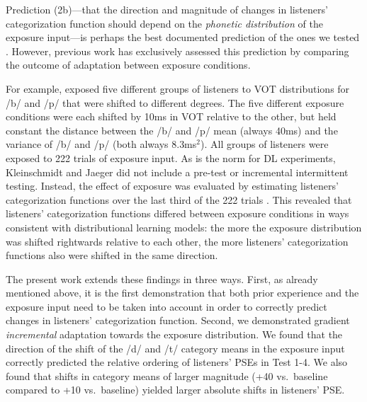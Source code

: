 \documentclass[
  11pt,
  man,mask,floatsintext]{apa6}
\begin{document}
Prediction (2b)---that the direction and magnitude of changes in listeners' categorization function should depend on the \emph{phonetic distribution} of the exposure input---is perhaps the best documented prediction of the ones we tested \autocite{bejjanki2011,chladkova2017,clayards2008,colby2018,kleinschmidt-jaeger2011,kleinschmidt-jaeger2012,kleinschmidt-jaeger2016,nixon2016,saltzman-myers2021,theodore-monto2019}. However, previous work has exclusively assessed this prediction by comparing the outcome of adaptation between exposure conditions.

For example, \textcite{kleinschmidt-jaeger2016} exposed five different groups of listeners to VOT distributions for /b/ and /p/ that were shifted to different degrees. The five different exposure conditions were each shifted by 10ms in VOT relative to the other, but held constant the distance between the /b/ and /p/ mean (always 40ms) and the variance of /b/ and /p/ (both always 8.3ms\(^2\)). All groups of listeners were exposed to 222 trials of exposure input. As is the norm for DL experiments, Kleinschmidt and Jaeger did not include a pre-test or incremental intermittent testing. Instead, the effect of exposure was evaluated by estimating listeners' categorization functions over the last third of the 222 trials \autocites[another common approach is to average over \emph{all} trials, e.g.,][]{clayards2008,nixon2016}. This revealed that listeners' categorization functions differed between exposure conditions in ways consistent with distributional learning models: the more the exposure distribution was shifted rightwards relative to each other, the more listeners' categorization functions also were shifted in the same direction.

The present work extends these findings in three ways. First, as already mentioned above, it is the first demonstration that both prior experience and the exposure input need to be taken into account in order to correctly predict changes in listeners' categorization function. Second, we demonstrated gradient \emph{incremental} adaptation towards the exposure distribution. We found that the direction of the shift of the /d/ and /t/ category means in the exposure input correctly predicted the relative ordering of listeners' PSEs in Test 1-4. We also found that shifts in category means of larger magnitude (+40 vs.~baseline compared to +10 vs.~baseline) yielded larger absolute shifts in listeners' PSE.
\end{document}

